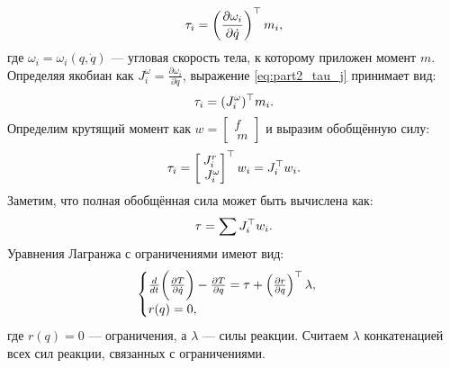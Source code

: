 \begin{equation}
	\label{eq:part2_tau_j}
	\tau_i = \left( \frac{\partial \omega_i}{\partial \dot{{q}}} \right)^\top {m}_i,
\end{equation}
%
где $\omega_i = \omega_i({q}, \dot{{q}})$ --- угловая скорость тела, к которому приложен момент ${m}$.
Определяя якобиан как ${J}^\omega_i = \frac{\partial \omega_i}{\partial \dot{{q}}}$, выражение \eqref{eq:part2_tau_j} принимает вид:
%
\begin{equation}
\tau_i = ({J}^\omega_i)^\top {m}_i.
\end{equation}
Определим крутящий момент как ${w} = \begin{bmatrix}
	{f} \\\ {m}
\end{bmatrix}$ и выразим обобщённую силу:
%
\begin{equation}
	\tau_i = \begin{bmatrix}
		{J}^r_i \\\ {J}^\omega_i
	\end{bmatrix}^\top
	{w}_i
	=
	{J}_i^\top {w}_i.
\end{equation}
Заметим, что полная обобщённая сила может быть вычислена как:
%
\begin{equation}
	\tau = \sum {J}_i^\top {w}_i.
\end{equation}
%
Уравнения Лагранжа с ограничениями имеют вид:
%
\begin{equation}
	\begin{cases}
		\frac{d}{dt} \bigg( 
		\frac{\partial T }{\partial \dot{{q}}}
		\bigg) - 
		\frac{\partial T }{\partial {q}} = \tau + \left( \frac{\partial {r}}{\partial {q}} \right)^\top \lambda,
		\\
		{r}({q}) = 0,
	\end{cases}
\end{equation}
%
%
где ${r}({q}) = 0$ --- ограничения, а $\lambda$ --- силы реакции. Считаем $\lambda$ конкатенацией всех сил реакции, связанных с ограничениями.

